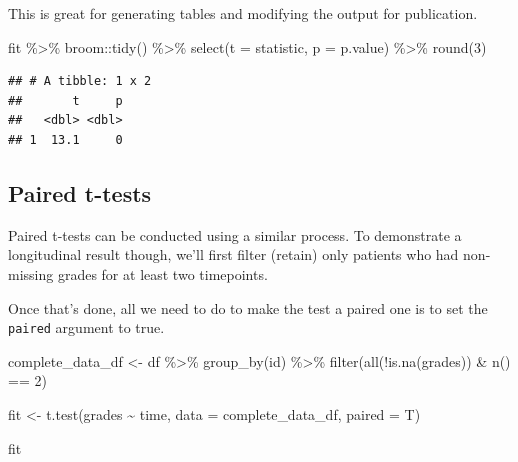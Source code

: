 \documentclass[
]{book}
\newenvironment{Shaded}{\begin{snugshade}}{\end{snugshade}}
\newcommand{\AttributeTok}[1]{\textcolor[rgb]{0.77,0.63,0.00}{#1}}
\newcommand{\DecValTok}[1]{\textcolor[rgb]{0.00,0.00,0.81}{#1}}
\newcommand{\FunctionTok}[1]{\textcolor[rgb]{0.00,0.00,0.00}{#1}}
\newcommand{\NormalTok}[1]{#1}
\newcommand{\OtherTok}[1]{\textcolor[rgb]{0.56,0.35,0.01}{#1}}
\newcommand{\SpecialCharTok}[1]{\textcolor[rgb]{0.00,0.00,0.00}{#1}}
\begin{document}
This is great for generating tables and modifying the output for publication.

\begin{Shaded}
\begin{Highlighting}[]
\NormalTok{fit }\SpecialCharTok{\%\textgreater{}\%} 
\NormalTok{  broom}\SpecialCharTok{::}\FunctionTok{tidy}\NormalTok{() }\SpecialCharTok{\%\textgreater{}\%} 
  \FunctionTok{select}\NormalTok{(}\AttributeTok{t =}\NormalTok{ statistic, }\AttributeTok{p =}\NormalTok{ p.value) }\SpecialCharTok{\%\textgreater{}\%} 
  \FunctionTok{round}\NormalTok{(}\DecValTok{3}\NormalTok{)}
\end{Highlighting}
\end{Shaded}

\begin{verbatim}
## # A tibble: 1 x 2
##       t     p
##   <dbl> <dbl>
## 1  13.1     0
\end{verbatim}

\hypertarget{paired-t-tests}{%
\subsection{Paired t-tests}\label{paired-t-tests}}

Paired t-tests can be conducted using a similar process. To demonstrate a longitudinal result though, we'll first filter (retain) only patients who had non-missing grades for at least two timepoints.

Once that's done, all we need to do to make the test a paired one is to set the \texttt{paired} argument to true.

\begin{Shaded}
\begin{Highlighting}[]
\NormalTok{complete\_data\_df }\OtherTok{\textless{}{-}}\NormalTok{ df }\SpecialCharTok{\%\textgreater{}\%} 
  \FunctionTok{group\_by}\NormalTok{(id) }\SpecialCharTok{\%\textgreater{}\%} 
  \FunctionTok{filter}\NormalTok{(}\FunctionTok{all}\NormalTok{(}\SpecialCharTok{!}\FunctionTok{is.na}\NormalTok{(grades)) }\SpecialCharTok{\&} \FunctionTok{n}\NormalTok{() }\SpecialCharTok{==} \DecValTok{2}\NormalTok{)}

\NormalTok{fit }\OtherTok{\textless{}{-}} \FunctionTok{t.test}\NormalTok{(grades }\SpecialCharTok{\textasciitilde{}}\NormalTok{ time, }\AttributeTok{data =}\NormalTok{ complete\_data\_df, }\AttributeTok{paired =}\NormalTok{ T)}

\NormalTok{fit}
\end{Highlighting}
\end{Shaded}
\end{document}

